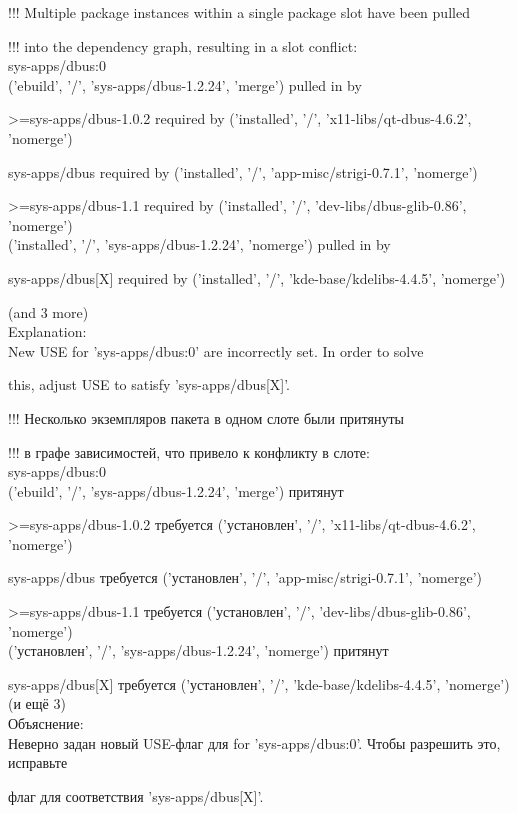 \documentclass[10pt]{book}
\begin{document}
 \begin{tcolorbox}
!!! Multiple package instances within a single package slot have been pulled

!!! into the dependency graph, resulting in a slot conflict:\\

sys-apps/dbus:0\\

  ('ebuild', '/', 'sys-apps/dbus-1.2.24', 'merge') pulled in by
  
    >=sys-apps/dbus-1.0.2 required by ('installed', '/', 'x11-libs/qt-dbus-4.6.2', 'nomerge')
    
    sys-apps/dbus required by ('installed', '/', 'app-misc/strigi-0.7.1', 'nomerge')
    
    >=sys-apps/dbus-1.1 required by ('installed', '/', 'dev-libs/dbus-glib-0.86', 'nomerge')\\

  ('installed', '/', 'sys-apps/dbus-1.2.24', 'nomerge') pulled in by
  
    sys-apps/dbus[X] required by ('installed', '/', 'kde-base/kdelibs-4.4.5', 'nomerge')
    
    (and 3 more)\\

  Explanation:\\

    New USE for 'sys-apps/dbus:0' are incorrectly set. In order to solve
    
    this, adjust USE to satisfy 'sys-apps/dbus[X]'.
\end{tcolorbox}
 \begin{tcolorbox}
!!! Несколько экземпляров пакета в одном слоте были притянуты

!!! в графе зависимостей, что привело к конфликту в слоте:\\

sys-apps/dbus:0\\

  ('ebuild', '/', 'sys-apps/dbus-1.2.24', 'merge') притянут
  
    >=sys-apps/dbus-1.0.2 требуется ('установлен', '/', 'x11-libs/qt-dbus-4.6.2', 'nomerge')
    
    sys-apps/dbus требуется ('установлен', '/', 'app-misc/strigi-0.7.1', 'nomerge')
    
    >=sys-apps/dbus-1.1 требуется ('установлен', '/', 'dev-libs/dbus-glib-0.86', 'nomerge')\\

  ('установлен', '/', 'sys-apps/dbus-1.2.24', 'nomerge') притянут
  
    sys-apps/dbus[X] требуется ('установлен', '/', 'kde-base/kdelibs-4.4.5', 'nomerge')
    (и ещё 3)\\

  Объяснение:\\

    Неверно задан новый USE-флаг для  for 'sys-apps/dbus:0'. Чтобы разрешить это, исправьте 
    
    флаг для соответствия 'sys-apps/dbus[X]'.
\end{tcolorbox}
\end{document}
